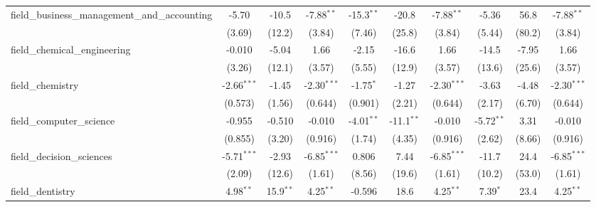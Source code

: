 \begin{tabular}{lccccccccc}
   field\_business\_management\_and\_accounting                & -5.70         & -10.5         & -7.88$^{**}$  & -15.3$^{**}$   & -20.8        & -7.88$^{**}$  & -5.36         & 56.8           & -7.88$^{**}$\\   
                                                               & (3.69)        & (12.2)        & (3.84)        & (7.46)         & (25.8)       & (3.84)        & (5.44)        & (80.2)         & (3.84)\\   
   field\_chemical\_engineering                                & -0.010        & -5.04         & 1.66          & -2.15          & -16.6        & 1.66          & -14.5         & -7.95          & 1.66\\   
                                                               & (3.26)        & (12.1)        & (3.57)        & (5.55)         & (12.9)       & (3.57)        & (13.6)        & (25.6)         & (3.57)\\   
   field\_chemistry                                            & -2.66$^{***}$ & -1.45         & -2.30$^{***}$ & -1.75$^{*}$    & -1.27        & -2.30$^{***}$ & -3.63         & -4.48          & -2.30$^{***}$\\   
                                                               & (0.573)       & (1.56)        & (0.644)       & (0.901)        & (2.21)       & (0.644)       & (2.17)        & (6.70)         & (0.644)\\   
   field\_computer\_science                                    & -0.955        & -0.510        & -0.010        & -4.01$^{**}$   & -11.1$^{**}$ & -0.010        & -5.72$^{**}$  & 3.31           & -0.010\\   
                                                               & (0.855)       & (3.20)        & (0.916)       & (1.74)         & (4.35)       & (0.916)       & (2.62)        & (8.66)         & (0.916)\\   
   field\_decision\_sciences                                   & -5.71$^{***}$ & -2.93         & -6.85$^{***}$ & 0.806          & 7.44         & -6.85$^{***}$ & -11.7         & 24.4           & -6.85$^{***}$\\   
                                                               & (2.09)        & (12.6)        & (1.61)        & (8.56)         & (19.6)       & (1.61)        & (10.2)        & (53.0)         & (1.61)\\   
   field\_dentistry                                            & 4.98$^{**}$   & 15.9$^{**}$   & 4.25$^{**}$   & -0.596         & 18.6         & 4.25$^{**}$   & 7.39$^{*}$    & 23.4           & 4.25$^{**}$\\   

\end{tabular}
